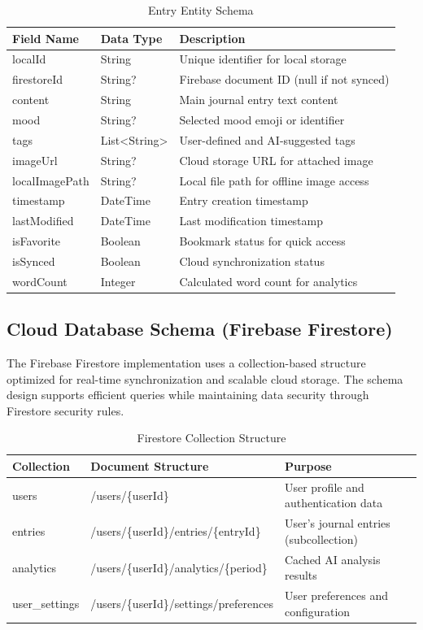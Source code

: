 \begin{table}[H]
\centering
\caption{Entry Entity Schema}
\label{tab:entry-schema}
\begin{tabular}{|p{3cm}|p{2cm}|p{8cm}|}
\hline
\textbf{Field Name} & \textbf{Data Type} & \textbf{Description} \\
\hline
localId & String & Unique identifier for local storage \\
\hline
firestoreId & String? & Firebase document ID (null if not synced) \\
\hline
content & String & Main journal entry text content \\
\hline
mood & String? & Selected mood emoji or identifier \\
\hline
tags & List<String> & User-defined and AI-suggested tags \\
\hline
imageUrl & String? & Cloud storage URL for attached image \\
\hline
localImagePath & String? & Local file path for offline image access \\
\hline
timestamp & DateTime & Entry creation timestamp \\
\hline
lastModified & DateTime & Last modification timestamp \\
\hline
isFavorite & Boolean & Bookmark status for quick access \\
\hline
isSynced & Boolean & Cloud synchronization status \\
\hline
wordCount & Integer & Calculated word count for analytics \\
\hline
\end{tabular}
\end{table}

\subsection{Cloud Database Schema (Firebase Firestore)}\label{subsec:cloud-schema}

The Firebase Firestore implementation uses a collection-based structure optimized for real-time synchronization and scalable cloud storage. The schema design supports efficient queries while maintaining data security through Firestore security rules.

\begin{table}[H]
\centering
\caption{Firestore Collection Structure}
\label{tab:firestore-collections}
\begin{tabular}{|p{3cm}|p{5cm}|p{6cm}|}
\hline
\textbf{Collection} & \textbf{Document Structure} & \textbf{Purpose} \\
\hline
users & /users/\{userId\} & User profile and authentication data \\
\hline
entries & /users/\{userId\}/entries/\{entryId\} & User's journal entries (subcollection) \\
\hline
analytics & /users/\{userId\}/analytics/\{period\} & Cached AI analysis results \\
\hline
user\_settings & /users/\{userId\}/settings/preferences & User preferences and configuration \\
\hline
\end{tabular}
\end{table}

